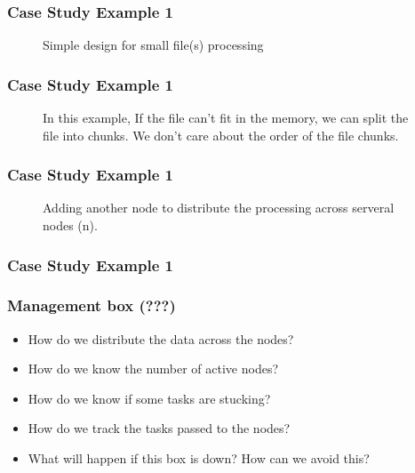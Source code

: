 \begin{frame}[plain,c]
	\frametitle{Case Study Example 1}
		\begin{figure}
		
		\caption{Simple design for small file(s) processing } \label{fig:DS1}
		\end{figure}
\end{frame}
\begin{frame}[plain,c]
	\frametitle{Case Study Example 1}
	\begin{figure}
		\centering
		
		\caption{In this example, If the file can't fit in the memory, we can split the file into chunks. We don't care about the order of the file chunks. } \label{fig:DS2}
	\end{figure}

\end{frame}
\begin{frame}[plain,c]
	\frametitle{Case Study Example 1}
		\begin{figure}
		\centering
			
			\caption{Adding another node to distribute the processing across serveral nodes (n). } \label{fig:DS3}
		\end{figure}

\end{frame}
\begin{frame}[plain,c]
	\frametitle{Case Study Example 1}
	\begin{figure}
		\centering
		
	\end{figure}
	
\end{frame}

\begin{frame}
	\frametitle{Management box (???)}
	\begin{itemize} [<+->]
		\item How do we distribute the data across the nodes?
		\item How do we know the number of active nodes?
		\item How do we know if some tasks are stucking?
		\item How do we track the tasks passed to the nodes?
		\item What will happen if this box is down? How can we avoid this?
	\end{itemize}
\end{frame}

